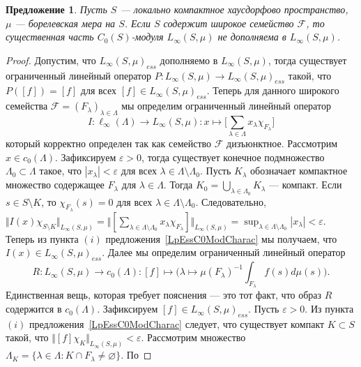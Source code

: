 \documentclass[12pt]{article}
\newtheorem{proposition}[theorem]{Предложение}
\begin{document}
\begin{proposition}\label{LInfEssNotCompl} Пусть $S$ --- локально компактное
    хаусдорфово пространство, $\mu$ --- борелевская мера на $S$. Если $S$
    содержит широкое семейство $\mathcal{F}$, то существенная часть
    $C_0(S)$-модуля $L_\infty(S,\mu)$ не дополняема в $L_\infty(S,\mu)$.
\end{proposition}
\begin{proof} Допустим, что ${L_\infty(S,\mu)}_{ess}$ дополняемо в
    $L_\infty(S,\mu)$, тогда существует ограниченный линейный оператор
    $P:L_\infty(S,\mu)\to {L_\infty(S,\mu)}_{ess}$ такой, что $P([f])=[f]$ для
    всех $[f]\in {L_\infty(S,\mu)}_{ess}$. Теперь для данного широкого семейства
    $\mathcal{F}={(F_\lambda)}_{\lambda\in\Lambda}$ мы определим ограниченный
    линейный оператор
    $$
        I:\ell_\infty(\Lambda)\to L_\infty(S,\mu):
        x\mapsto\biggl[\sum_{\lambda\in\Lambda}x_\lambda \chi_{F_\lambda}\biggr]
    $$
    который корректно определен так как семейство $\mathcal{F}$ дизъюнктное.
    Рассмотрим $x\in c_0(\Lambda)$. Зафиксируем $\varepsilon > 0$, тогда
    существует конечное подмножество $\Lambda_0\subset\Lambda$ такое, что
    $|x_\lambda|<\varepsilon$ для всех $\lambda\in\Lambda\setminus\Lambda_0$.
    Пусть $K_\lambda$ обозначает компактное множество содержащее $F_\lambda$ для
    $\lambda\in\Lambda$. Тогда $K_0=\bigcup_{\lambda\in\Lambda_0}K_\lambda$ ---
    компакт. Если $s\in S\setminus K$, то $\chi_{F_\lambda}(s)=0$ для всех
    $\lambda\in\Lambda\setminus\Lambda_0$. Следовательно, $\Vert
        I(x)\chi_{S\setminus K}\Vert_{L_\infty(S,\mu)}
        =\Vert[\sum_{\lambda\in\Lambda\setminus\Lambda_0}x_\lambda\chi_{F_\lambda}]
        \Vert_{L_\infty(S,\mu)}
        =\sup_{\lambda\in\Lambda\setminus\Lambda_0}|x_\lambda|<\varepsilon$. Теперь
    из пункта $(i)$ предложения~\ref{LpEssC0ModCharac} мы получаем, что $I(x)\in
        {L_\infty(S,\mu)}_{ess}$. Далее мы определим ограниченный линейный оператор
    $$
        R:L_\infty(S,\mu)\to c_0(\Lambda):
        [f]\mapsto \biggl(
        \lambda\mapsto{\mu(F_\lambda)}^{-1}\int_{F_\lambda} f(s)d\mu(s)
        \biggr).
    $$
    Единственная вещь, которая требует пояснения --- это тот факт, что образ $R$
    содержится в $c_0(\Lambda)$. Зафиксируем $[f]\in {L_\infty(S,\mu)}_{ess}$.
    Пусть $\varepsilon>0$. Из пункта $(i)$ предложения~\ref{LpEssC0ModCharac}
    следует, что существует компакт $K\subset S$ такой, что $\Vert
        [f]\chi_{K}\Vert_{L_\infty(S,\mu)}<\varepsilon$. Рассмотрим множество
    $\Lambda_K=\{\lambda\in\Lambda: K\cap F_\lambda\neq\varnothing \}$. По

\end{proof}
\end{document}
